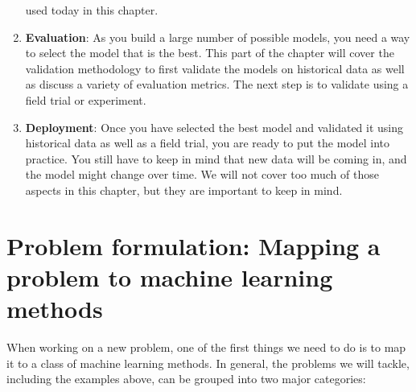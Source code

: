 \documentclass[]{krantz}
\begin{document}
\begin{enumerate}
  used today in this chapter.
\item
  \textbf{Evaluation}: As you build a large number of possible models,
  you need a way to select the model that is the best. This part of the
  chapter will cover the validation methodology to first validate the
  models on historical data as well as discuss a variety of evaluation
  metrics. The next step is to validate using a field trial or
  experiment.
\item
  \textbf{Deployment}: Once you have selected the best model and
  validated it using historical data as well as a field trial, you are
  ready to put the model into practice. You still have to keep in mind
  that new data will be coming in, and the model might change over time.
  We will not cover too much of those aspects in this chapter, but they
  are important to keep in mind.
\end{enumerate}

\section{Problem formulation: Mapping a problem to machine learning
methods}\label{problem-formulation-mapping-a-problem-to-machine-learning-methods}

When working on a new problem, one of the first things we need to do is
to map it to a class of machine learning methods. In general, the
problems we will tackle, including the examples above, can be grouped
into two major categories:
\end{document}
